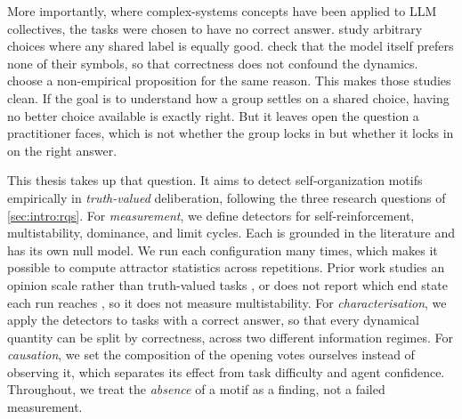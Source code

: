 More importantly, where complex-systems concepts have been applied to \ac{LLM}
collectives, the tasks were chosen to have no correct answer.
\citet{ashery2025conventions} study arbitrary choices where any shared label is
equally good. \citet{mehdizadeh2026topologymemory} check that the model itself
prefers none of their symbols, so that correctness does not confound the
dynamics. \citet{cau2026agreementdrift} choose a non-empirical proposition for
the same reason. This makes those studies clean. If the goal is to understand how
a group settles on a shared choice, having no better choice available is exactly
right. But it leaves open the question a practitioner faces, which is not whether
the group locks in but whether it locks in on the right answer.

This thesis takes up that question. It aims to detect self-organization motifs
empirically in \emph{truth-valued} deliberation, following the three research
questions of \autoref{sec:intro:rqs}. For \emph{measurement}, we define detectors
for self-reinforcement, multistability, dominance, and limit cycles. Each is
grounded in the literature and has its own null model. We run each configuration
many times, which makes it possible to compute attractor statistics across
repetitions. Prior work studies an opinion scale rather than
truth-valued tasks \citep{cau2026agreementdrift}, or does not report which end
state each run reaches \citep{mehdizadeh2026topologymemory}, so
it does not measure multistability. For \emph{characterisation},
we apply the detectors to tasks with a correct answer, so that every dynamical
quantity can be split by correctness, across two different information regimes.
For \emph{causation}, we set the composition of the opening votes ourselves
instead of observing it, which separates its effect from task difficulty and
agent confidence. Throughout, we treat the \emph{absence} of a motif as a
finding, not a failed measurement.